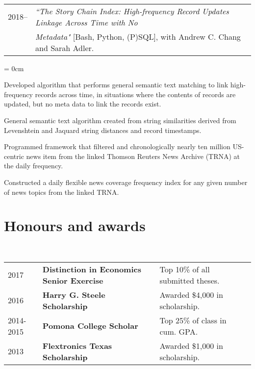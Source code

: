 \documentclass[a4paper, 11pt]{article}
\begin{document}
    \vspace*{1em}

    ~\begin{tabular}{lP{15cm}}
      2018--& \textit{``The Story Chain Index: High-frequency Record Updates Linkage Across Time with No}\\
      & \textit{Metadata"} {[Bash, Python, (P)SQL]}, with Andrew C. Chang and Sarah Adler.
    \end{tabular}

    \begin{compactitem}\parskip = 0cm
      \item Developed algorithm that performs general semantic text matching to link high-frequency records across time, in situations where the contents of records are updated, but no meta data to link the records exist.
      \item General semantic text algorithm created from string similarities derived from Levenshtein and Jaquard string distances and record timestamps.
      \item Programmed framework that filtered and chronologically nearly ten million US-centric news item from the linked Thomson Reuters News Archive (TRNA) at the daily frequency.
      \item Constructed a daily flexible news coverage frequency index for any given number of news topics from the linked TRNA.
    \end{compactitem}

  \section{Honours and awards}
    ~\begin{tabular}{lllP{1cm}}
      2017 & \textbf{Distinction in Economics Senior Exercise} & Top 10\% of all submitted theses.\\
      2016 & \textbf{Harry G. Steele Scholarship} & Awarded \$4,000 in scholarship.\\
      2014-2015 & \textbf{Pomona College Scholar} & Top 25\% of class in cum. GPA.\\
      2013 & \textbf{Flextronics Texas Scholarship} & Awarded \$1,000 in scholarship.
    \end{tabular}
\end{document}
